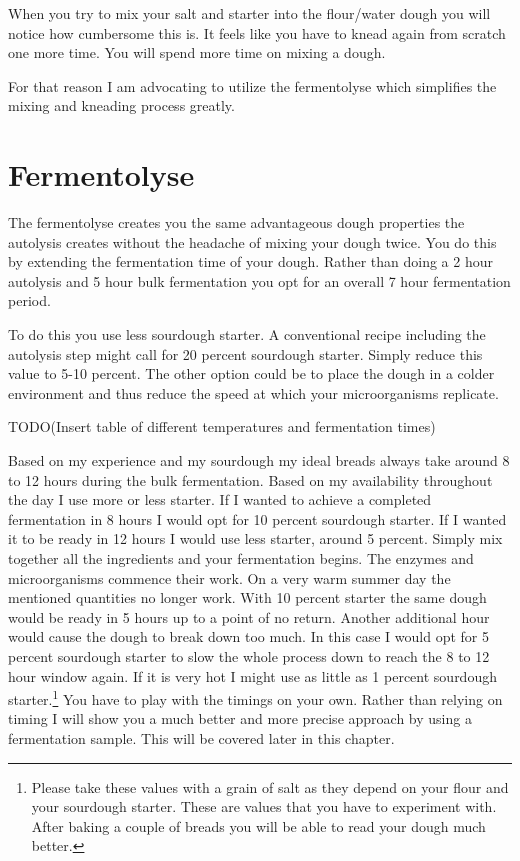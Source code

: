 When you try to mix your salt and starter into the flour/water dough you will
notice how cumbersome this is. It feels like you have to knead again from scratch
one more time. You will spend more time on mixing a dough.

For that reason I am advocating to utilize the fermentolyse which simplifies
the mixing and kneading process greatly.

\section{Fermentolyse}

The fermentolyse creates you the same advantageous dough properties the
autolysis creates without the headache of mixing your dough twice. You do this
by extending the fermentation time of your dough. Rather than doing a 2 hour
autolysis and 5 hour bulk fermentation you opt for an overall 7 hour
fermentation period.

To do this you use less sourdough starter. A conventional recipe including the
autolysis step might call for 20 percent sourdough starter. Simply reduce this
value to 5-10 percent. The other option could be to place the dough in a colder
environment and thus reduce the speed at which your microorganisms replicate.

TODO(Insert table of different temperatures and fermentation times)

Based on my experience and my sourdough my ideal breads always take around 8
to 12 hours during the bulk fermentation. Based on my availability throughout
the day I use more or less starter. If I wanted to achieve a completed
fermentation in 8 hours I would opt for 10 percent sourdough starter. If I
wanted it to be ready in 12 hours I would use less starter, around 5 percent.
Simply mix together all the ingredients and your fermentation begins. The
enzymes and microorganisms commence their work. On a very warm summer day the
mentioned quantities no longer work. With 10 percent starter the same dough
would be ready in 5 hours up to a point of no return. Another additional hour
would cause the dough to break down too much. In this case I would opt for 5
percent sourdough starter to slow the whole process down to reach the 8 to 12
hour window again. If it is very hot I might use as little as 1 percent
sourdough starter.\footnote{Please take these values with a grain of salt as
they depend on your flour and your sourdough starter. These are values that
you have to experiment with. After baking a couple of breads you will be able
to read your dough much better.} You have to play with the timings on your own.
Rather than relying on timing I will show you a much better and more precise approach
by using a fermentation sample. This will be covered later in this chapter.

